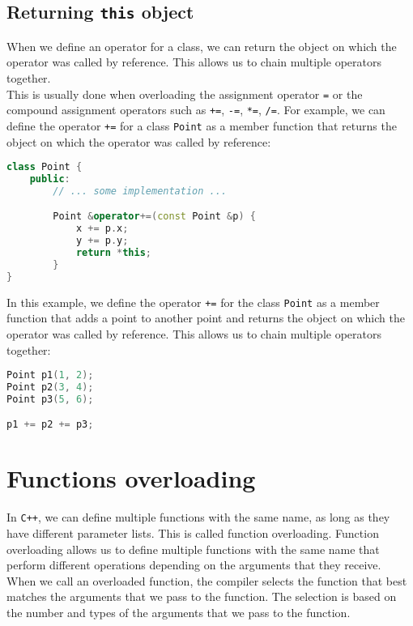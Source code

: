 \subsection{Returning \texttt{this} object}

When we define an operator for a class, we can return the object on which the operator
was called by reference. This allows us to chain multiple operators together.\\

This is usually done when overloading the assignment operator \texttt{=} or the
compound assignment operators such as \texttt{+=}, \texttt{-=}, \texttt{*=}, \texttt{/=}.
For example, we can define the operator \texttt{+=} for a class \texttt{Point} as a
member function that returns the object on which the operator was called by reference:\\

\begin{lstlisting}[language=C++]
class Point {
    public:
        // ... some implementation ...

        Point &operator+=(const Point &p) {
            x += p.x;
            y += p.y;
            return *this;
        }
}
\end{lstlisting}

In this example, we define the operator \texttt{+=} for the class \texttt{Point} as a
member function that adds a point to another point and returns the object on which the
operator was called by reference. This allows us to chain multiple operators together:\\

\begin{lstlisting}[language=C++]
Point p1(1, 2);
Point p2(3, 4);
Point p3(5, 6);

p1 += p2 += p3;
\end{lstlisting}

\section{Functions overloading}

In \texttt{C++}, we can define multiple functions with the same name, as long as they
have different parameter lists. This is called function overloading. Function overloading
allows us to define multiple functions with the same name that perform different operations
depending on the arguments that they receive.\\

When we call an overloaded function, the compiler selects the function that best matches
the arguments that we pass to the function. The selection is based on the number and
types of the arguments that we pass to the function.\\

